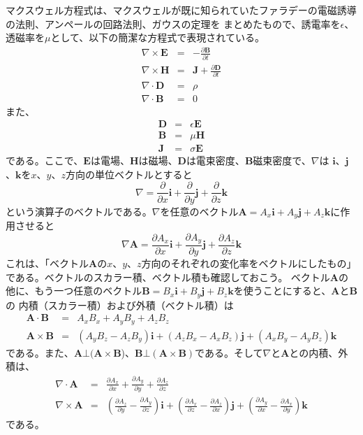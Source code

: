 マクスウェル方程式は、マクスウェルが既に知られていたファラデーの電磁誘導の法則、アンペールの回路法則、ガウスの定理を
まとめたもので、誘電率を$\epsilon$、透磁率を$\mu$として、以下の簡潔な方程式で表現されている。
\begin{eqnarray}
\nabla \times \bm{E} &=& -\frac{\partial \bm{B}}{\partial t} \label{eq:mxwl-E}\\
\nabla \times \bm{H} &=& \bm{J} + \frac{\partial \bm{D}}{\partial t} \label{eq:mxwl-H}\\
\nabla \cdot \bm{D}  &=& \rho \label{eq:mxwl-D}\\
\nabla \cdot \bm{B}  &=& 0 \label{eq:mxwl-B}
\end{eqnarray}
また、
\begin{eqnarray}
\bm{D} &=& \epsilon \bm{E} \label{eq:mxwl-D2}\\
\bm{B} &=& \mu \bm{H} \label{eq:mxwl-B2}\\
\bm{J} &=& \sigma \bm{E} \label{eq:mxwl-J}
\end{eqnarray}
である。ここで、$\bm{E}$は電場、$\bm{H}$は磁場、$\bm{D}$は電束密度、$\bm{B}$磁束密度で、$\nabla$は
$\bm{i}$、$\bm{j}$、$\bm{k}$を$x$、$y$、$z$方向の単位ベクトルとすると
\[
\nabla = \frac{\partial}{\partial x} \bm{i} + \frac{\partial}{\partial y} \bm{j} + \frac{\partial}{\partial z} \bm{k}
\]
という演算子のベクトルである。$\nabla$を任意のベクトル$\bm{A}=A_x\bm{i} + A_y\bm{j} + A_z\bm{k}$に作用させると
\[
\nabla\bm{A} = \frac{\partial A_x}{\partial x} \bm{i} + \frac{\partial A_y}{\partial y} \bm{j} + \frac{\partial A_z}{\partial z} \bm{k}
\]
これは、「ベクトル$\bm{A}$の$x$、$y$、$z$方向のそれぞれの変化率をベクトルにしたもの」である。ベクトルのスカラー積、ベクトル積も確認しておこう。
ベクトル$\bm{A}$の他に、もう一つ任意のベクトル$\bm{B}=B_x\bm{i} + B_y\bm{j} + B_z\bm{k}$を使うことにすると、$\bm{A}$と$\bm{B}$の
内積（スカラー積）および外積（ベクトル積）は
\begin{eqnarray*}
\bm{A} \cdot \bm{B} &=& A_xB_x + A_yB_y + A_zB_z \\
\bm{A}\times\bm{B} &=& (A_yB_z - A_zB_y)\bm{i} + (A_zB_x - A_xB_z)\bm{j} + (A_xB_y - A_yB_z)\bm{k}
\end{eqnarray*}
である。また、$\bm{A}\bot(\bm{A}\times\bm{B}$)、$\bm{B}\bot(\bm{A}\times\bm{B})$である。そして$\nabla$と$\bm{A}$との内積、外積は、
\begin{eqnarray*}
\nabla \cdot \bm{A} &=& \frac{\partial A_x}{\partial x} + \frac{\partial A_y}{\partial y} + \frac{\partial A_z}{\partial z} \\
\nabla \times\bm{A} &=& (\frac{\partial A_z}{\partial y} - \frac{\partial A_y}{\partial z})\bm{i} + (\frac{\partial A_x}{\partial z} - \frac{\partial A_z}{\partial x})\bm{j} + (\frac{\partial A_y}{\partial x} - \frac{\partial A_x}{\partial y})\bm{k}
\end{eqnarray*}
である。

